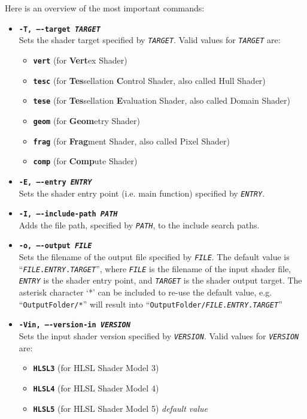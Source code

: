\documentclass{article}
\begin{document}
Here is an overview of the most important commands:
\begin{itemize}
	\item[] \textbf{\texttt{-T, ----target \textit{TARGET}}} \\
	Sets the shader target specified by \texttt{\textit{TARGET}}.
	Valid values for \texttt{\textit{TARGET}} are:
	\begin{itemize}
		\item[] \textbf{\texttt{vert}} (for \textbf{Vert}ex Shader)
		\item[] \textbf{\texttt{tesc}} (for \textbf{Tes}sellation \textbf{C}ontrol Shader, also called Hull Shader)
		\item[] \textbf{\texttt{tese}} (for \textbf{Tes}sellation \textbf{E}valuation Shader, also called Domain Shader)
		\item[] \textbf{\texttt{geom}} (for \textbf{Geom}etry Shader)
		\item[] \textbf{\texttt{frag}} (for \textbf{Frag}ment Shader, also called Pixel Shader)
		\item[] \textbf{\texttt{comp}} (for \textbf{Comp}ute Shader)
	\end{itemize}
	
	\item[] \textbf{\texttt{-E, ----entry \textit{ENTRY}}} \\
	Sets the shader entry point (i.e. main function) specified by \texttt{\textit{ENTRY}}.
	
	\item[] \textbf{\texttt{-I, ----include-path \textit{PATH}}} \\
	Adds the file path, specified by \texttt{\textit{PATH}}, to the include search paths.
	
	\item[] \textbf{\texttt{-o, ----output \textit{FILE}}} \\
	Sets the filename of the output file specified by \texttt{\textit{FILE}}.
	The default value is ``\texttt{\textit{FILE}.\textit{ENTRY}.\textit{TARGET}}'',
	where \texttt{\textit{FILE}} is the filename of the input shader file, \texttt{\textit{ENTRY}} is the shader entry point,
	and \texttt{\textit{TARGET}} is the shader output target. The asterisk character `*' can be included to
	re-use the default value, e.g. ``\texttt{OutputFolder/*}'' will result into
	``\texttt{OutputFolder/\textit{FILE}.\textit{ENTRY}.\textit{TARGET}}''
	
	\item[] \textbf{\texttt{-Vin, ----version-in \textit{VERSION}}} \\
	Sets the input shader version specified by \texttt{\textit{VERSION}}.
	Valid values for \texttt{\textit{VERSION}} are:
	\begin{itemize}
		\item[] \textbf{\texttt{HLSL3}} (for HLSL Shader Model 3)
		\item[] \textbf{\texttt{HLSL4}} (for HLSL Shader Model 4)
		\item[] \textbf{\texttt{HLSL5}} (for HLSL Shader Model 5) \textit{default value}
	\end{itemize}
	

\end{itemize}
\end{document}
